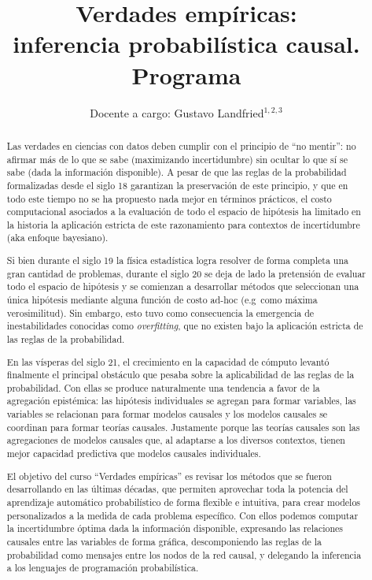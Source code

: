 \documentclass[10pt]{article}
\title{\huge Verdades empíricas: \\ inferencia probabilística causal. \\[0.4cm]  \LARGE Programa}
\author{Docente a cargo: Gustavo Landfried$^{1,2,3}$}
\affil{\small 1. Departamento de Computación. \\ Facultad de Ciencias Exactas y Naturales.  \\ Universidad de Buenos Aires. }
\affil{\vspace{-0.2cm}\small 2. Laboratorios de Métodos Bayesianos}
\affil{\vspace{-0.2cm}\small 3. Bayes Plurinacional}
\affil[]{Correspondencia: \texttt{glandfried@dc.uba.ar}}
\begin{document}
\maketitle

\begin{abstract}
Las verdades en ciencias con datos deben cumplir con el principio de ``no mentir'': no afirmar más de lo que se sabe (maximizando incertidumbre) sin ocultar lo que sí se sabe (dada la información disponible).
A pesar de que las reglas de la probabilidad formalizadas desde el siglo 18 garantizan la preservación de este principio, y que en todo este tiempo no se ha propuesto nada mejor en términos prácticos, el costo computacional asociados a la evaluación de todo el espacio de hipótesis ha limitado en la historia la aplicación estricta de este razonamiento para contextos de incertidumbre (aka enfoque bayesiano).


Si bien durante el siglo 19 la física estadística logra resolver de forma completa una gran cantidad de problemas, durante el siglo 20 se deja de lado la pretensión de evaluar todo el espacio de hipótesis y se comienzan a desarrollar métodos que seleccionan una única hipótesis mediante alguna función de costo ad-hoc (e.g~como máxima verosimilitud).
Sin embargo, esto tuvo como consecuencia la emergencia de inestabilidades conocidas como \emph{overfitting}, que no existen bajo la aplicación estricta de las reglas de la probabilidad.


En las vísperas del siglo 21, el crecimiento en la capacidad de cómputo levantó finalmente el principal obstáculo que pesaba sobre la aplicabilidad de las reglas de la probabilidad.
Con ellas se produce naturalmente una tendencia a favor de la agregación epistémica: las hipótesis individuales se agregan para formar variables, las variables se relacionan para formar modelos causales y los modelos causales se coordinan para formar teorías causales.
Justamente porque las teorías causales son las agregaciones de modelos causales que, al adaptarse a los diversos contextos, tienen mejor capacidad predictiva que modelos causales individuales.


El objetivo del curso ``Verdades empíricas'' es revisar los métodos que se fueron desarrollando en las últimas décadas, que permiten aprovechar toda la potencia del aprendizaje automático probabilístico de forma flexible e intuitiva, para crear modelos personalizados a la medida de cada problema específico.
Con ellos podemos computar la incertidumbre óptima dada la información disponible, expresando las relaciones causales entre las variables de forma gráfica, descomponiendo las reglas de la probabilidad como mensajes entre los nodos de la red causal, y delegando la inferencia a los lenguajes de programación probabilística.


\end{abstract}
\end{document}
